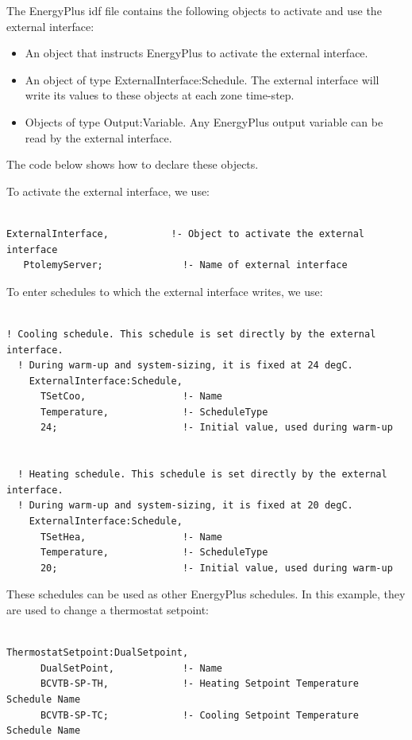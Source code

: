 The EnergyPlus idf file contains the following objects to activate and use the external interface:

\begin{itemize}
\item
  An object that instructs EnergyPlus to activate the external interface.
\item
  An object of type ExternalInterface:Schedule. The external interface will write its values to these objects at each zone time-step.
\item
  Objects of type Output:Variable. Any EnergyPlus output variable can be read by the external interface.
\end{itemize}

The code below shows how to declare these objects.

To activate the external interface, we use:

\begin{lstlisting}

ExternalInterface,           !- Object to activate the external interface
   PtolemyServer;              !- Name of external interface
\end{lstlisting}

To enter schedules to which the external interface writes, we use:

\begin{lstlisting}

! Cooling schedule. This schedule is set directly by the external interface.
  ! During warm-up and system-sizing, it is fixed at 24 degC.
    ExternalInterface:Schedule,
      TSetCoo,                 !- Name
      Temperature,             !- ScheduleType
      24;                      !- Initial value, used during warm-up


  ! Heating schedule. This schedule is set directly by the external interface.
  ! During warm-up and system-sizing, it is fixed at 20 degC.
    ExternalInterface:Schedule,
      TSetHea,                 !- Name
      Temperature,             !- ScheduleType
      20;                      !- Initial value, used during warm-up
\end{lstlisting}

These schedules can be used as other EnergyPlus schedules. In this example, they are used to change a thermostat setpoint:

\begin{lstlisting}

ThermostatSetpoint:DualSetpoint,
      DualSetPoint,            !- Name
      BCVTB-SP-TH,             !- Heating Setpoint Temperature Schedule Name
      BCVTB-SP-TC;             !- Cooling Setpoint Temperature Schedule Name
\end{lstlisting}

